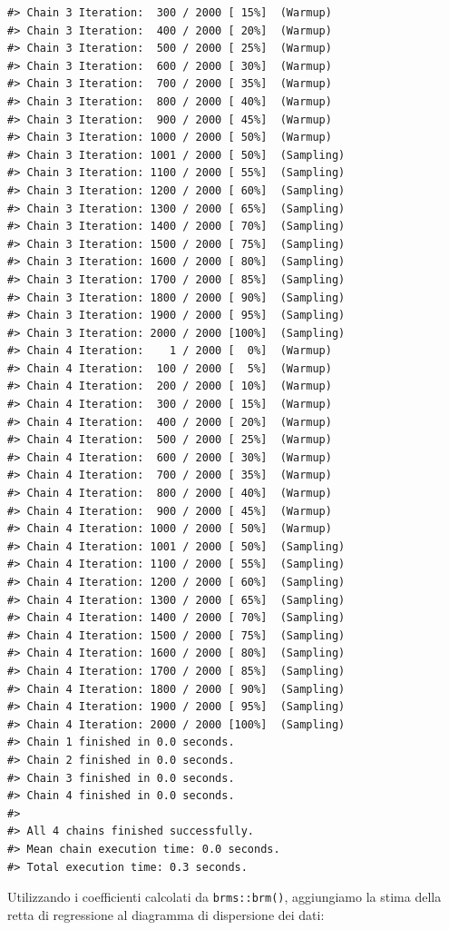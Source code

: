 \documentclass[
  10pt,
  italian,
  a4paper,
  extrafontsizes,onecolumn,openright
  ]{memoir}
\begin{document}
\begin{verbatim}
#> Chain 3 Iteration:  300 / 2000 [ 15%]  (Warmup) 
#> Chain 3 Iteration:  400 / 2000 [ 20%]  (Warmup) 
#> Chain 3 Iteration:  500 / 2000 [ 25%]  (Warmup) 
#> Chain 3 Iteration:  600 / 2000 [ 30%]  (Warmup) 
#> Chain 3 Iteration:  700 / 2000 [ 35%]  (Warmup) 
#> Chain 3 Iteration:  800 / 2000 [ 40%]  (Warmup) 
#> Chain 3 Iteration:  900 / 2000 [ 45%]  (Warmup) 
#> Chain 3 Iteration: 1000 / 2000 [ 50%]  (Warmup) 
#> Chain 3 Iteration: 1001 / 2000 [ 50%]  (Sampling) 
#> Chain 3 Iteration: 1100 / 2000 [ 55%]  (Sampling) 
#> Chain 3 Iteration: 1200 / 2000 [ 60%]  (Sampling) 
#> Chain 3 Iteration: 1300 / 2000 [ 65%]  (Sampling) 
#> Chain 3 Iteration: 1400 / 2000 [ 70%]  (Sampling) 
#> Chain 3 Iteration: 1500 / 2000 [ 75%]  (Sampling) 
#> Chain 3 Iteration: 1600 / 2000 [ 80%]  (Sampling) 
#> Chain 3 Iteration: 1700 / 2000 [ 85%]  (Sampling) 
#> Chain 3 Iteration: 1800 / 2000 [ 90%]  (Sampling) 
#> Chain 3 Iteration: 1900 / 2000 [ 95%]  (Sampling) 
#> Chain 3 Iteration: 2000 / 2000 [100%]  (Sampling) 
#> Chain 4 Iteration:    1 / 2000 [  0%]  (Warmup) 
#> Chain 4 Iteration:  100 / 2000 [  5%]  (Warmup) 
#> Chain 4 Iteration:  200 / 2000 [ 10%]  (Warmup) 
#> Chain 4 Iteration:  300 / 2000 [ 15%]  (Warmup) 
#> Chain 4 Iteration:  400 / 2000 [ 20%]  (Warmup) 
#> Chain 4 Iteration:  500 / 2000 [ 25%]  (Warmup) 
#> Chain 4 Iteration:  600 / 2000 [ 30%]  (Warmup) 
#> Chain 4 Iteration:  700 / 2000 [ 35%]  (Warmup) 
#> Chain 4 Iteration:  800 / 2000 [ 40%]  (Warmup) 
#> Chain 4 Iteration:  900 / 2000 [ 45%]  (Warmup) 
#> Chain 4 Iteration: 1000 / 2000 [ 50%]  (Warmup) 
#> Chain 4 Iteration: 1001 / 2000 [ 50%]  (Sampling) 
#> Chain 4 Iteration: 1100 / 2000 [ 55%]  (Sampling) 
#> Chain 4 Iteration: 1200 / 2000 [ 60%]  (Sampling) 
#> Chain 4 Iteration: 1300 / 2000 [ 65%]  (Sampling) 
#> Chain 4 Iteration: 1400 / 2000 [ 70%]  (Sampling) 
#> Chain 4 Iteration: 1500 / 2000 [ 75%]  (Sampling) 
#> Chain 4 Iteration: 1600 / 2000 [ 80%]  (Sampling) 
#> Chain 4 Iteration: 1700 / 2000 [ 85%]  (Sampling) 
#> Chain 4 Iteration: 1800 / 2000 [ 90%]  (Sampling) 
#> Chain 4 Iteration: 1900 / 2000 [ 95%]  (Sampling) 
#> Chain 4 Iteration: 2000 / 2000 [100%]  (Sampling) 
#> Chain 1 finished in 0.0 seconds.
#> Chain 2 finished in 0.0 seconds.
#> Chain 3 finished in 0.0 seconds.
#> Chain 4 finished in 0.0 seconds.
#> 
#> All 4 chains finished successfully.
#> Mean chain execution time: 0.0 seconds.
#> Total execution time: 0.3 seconds.
\end{verbatim}

Utilizzando i coefficienti calcolati da \texttt{brms::brm()}, aggiungiamo la stima della retta di regressione al diagramma di dispersione dei dati:
\end{document}
